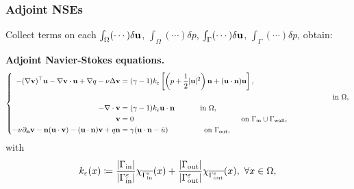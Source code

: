 \documentclass[10pt,xcolor=table,english]{beamer}   %
\begin{document}
\begin{frame}
    \frametitle{Adjoint NSEs}
    Collect terms on each $\int_\Omega (\cdots)\delta{\bf u}$, $\int_\Omega (\cdots)\delta p$, $\int_\Gamma (\cdots)\delta{\bf u}$, $\int_\Gamma (\cdots)\delta p$, obtain:
    \vspace{1cm}
    
    \textbf{Adjoint Navier-Stokes equations.}
    \begin{equation*}
    \left\{\begin{split}
    -(\nabla{\bf v})^\top{\bf u} - \nabla{\bf v}\cdot{\bf u} + \nabla q - \nu\Delta{\bf v} &=  (\gamma - 1)k_\varepsilon\left[\left(p + \frac{1}{2}|{\bf u}|^2\right){\bf n} + ({\bf u}\cdot{\bf n}){\bf u}\right],\\
    &\hspace{10cm}\mbox{ in } \Omega,\\
    -\nabla\cdot{\bf v} &= (\gamma - 1)k_\varepsilon{\bf u}\cdot{\bf n} \hspace{1.1cm}\mbox{ in } \Omega,\\
    {\bf v} &= 0 \hspace{5cm}\mbox{ on } \Gamma_{\rm in}\cup\Gamma_{\rm wall},\\
    -\nu\partial_{\bf n}{\bf v} - {\bf n}({\bf u}\cdot{\bf v}) - ({\bf u}\cdot{\bf n}){\bf v} + q{\bf n} &= \gamma({\bf u}\cdot{\bf n} - \bar{u}) \hspace{1.6cm}\mbox{ on } \Gamma_{\rm out},  
    \end{split}\right.    
    \end{equation*}
    with
    \begin{align*}
    k_\varepsilon(x)\coloneqq \frac{|\Gamma_{\rm in}|}{|\Gamma_{\rm in}^\varepsilon|}\chi_{\overline{\Gamma_{\rm in}^\varepsilon}}(x) + \frac{|\Gamma_{\rm out}|}{|\Gamma_{\rm out}^\varepsilon|}\chi_{\overline{\Gamma_{\rm out}^\varepsilon}}(x),\ \forall x\in\Omega,
    \end{align*}
\end{frame}
\end{document}
